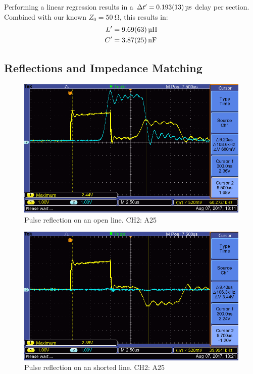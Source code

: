 \documentclass[a4paper]{scrartcl}
\begin{document}
Performing a linear regression results in a \(\Delta t' = \SI{0.193 \pm 0.013}{\micro\second}\) delay per section. Combined with our known \(Z_0 = \SI{50}{\ohm}\), this results in:
\begin{align*}
    L' &= \SI{9.69 \pm 0.63}{\micro\henry} \\
    C' &= \SI{3.87 \pm 0.25}{\nano\farad}
\end{align*}

\subsection{Reflections and Impedance Matching}
\begin{figure}
    \centering
    \includegraphics[width = 15cm]{data/ALL0003/F0003TEK.png}
    \caption{Pulse reflection on an open line. CH2: A25}
    \label{fig:open-line}
\end{figure}
\begin{figure}
    \centering
    \includegraphics[width = 15cm]{data/ALL0004/F0004TEK.png}
    \caption{Pulse reflection on an shorted line. CH2: A25}
    \label{fig:shorted-line}
\end{figure}
\end{document}
